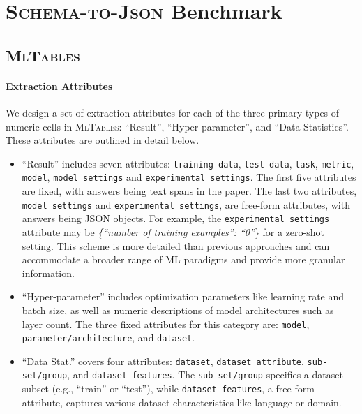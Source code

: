 \documentclass[11pt]{article}
\newcommand\task{\textsc{Schema-to-Json}}
\newcommand\data{\textsc{MlTables}}
\begin{document}
\section{\task{} Benchmark}
\label{sec:benchmark}


\subsection{\data{}}
\label{sec:mltab_appendix}









\paragraph{Extraction Attributes} We design a set of extraction attributes for each of the three primary types of numeric cells in \data{}: ``Result'', ``Hyper-parameter'', and ``Data Statistics''. These attributes are outlined in detail below.

\begin{itemize}[parsep=3pt,leftmargin=0.5cm]
    \item ``Result'' includes seven attributes: \texttt{training data}, \texttt{test data}, \texttt{task}, \texttt{metric}, \texttt{model}, \texttt{model settings} and \texttt{experimental settings}. The first five attributes are fixed, with answers being text spans in the paper. The last two attributes, \texttt{model settings} and \texttt{experimental settings}, are free-form attributes, with answers being JSON objects. 
    For example, the \texttt{experimental settings} attribute may be \textit{\{``number of training examples'': ``0''}\} for a zero-shot setting.
This scheme is more detailed than previous approaches \citep{hou-etal-2019-identification, kardas-etal-2020-axcell} and can accommodate a broader range of ML paradigms and provide more granular information.

\item ``Hyper-parameter'' includes optimization parameters like learning rate and batch size, as well as numeric descriptions of model architectures such as layer count. The three fixed attributes for this category are: \texttt{model}, \texttt{parameter/architecture}, and \texttt{dataset}.
    


\item ``Data Stat.'' covers four attributes: \texttt{dataset}, \texttt{dataset attribute}, \texttt{sub-set/group}, and \texttt{dataset features}. The \texttt{sub-set/group} specifies a dataset subset (e.g., ``train'' or ``test''), while \texttt{dataset features}, a free-form attribute, captures various dataset characteristics like language or domain.

\end{itemize}
\end{document}
